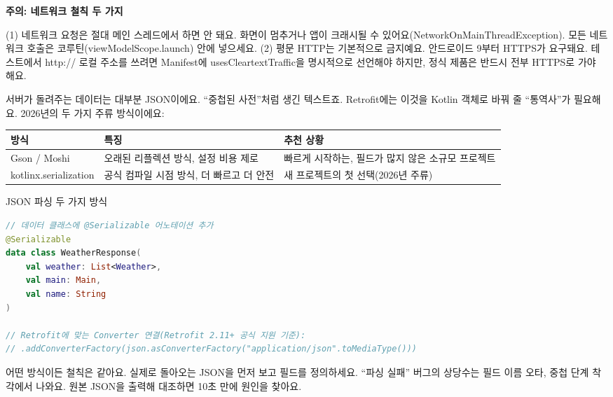 \textbf{주의: 네트워크 철칙 두 가지}\par

(1) 네트워크 요청은 절대 메인 스레드에서 하면 안 돼요. 화면이 멈추거나 앱이 크래시될 수 있어요(NetworkOnMainThreadException). 모든 네트워크 호출은 코루틴(viewModelScope.launch) 안에 넣으세요. (2) 평문 HTTP는 기본적으로 금지예요. 안드로이드 9부터 HTTPS가 요구돼요. 테스트에서 http:// 로컬 주소를 쓰려면 Manifest에 usesCleartextTraffic을 명시적으로 선언해야 하지만, 정식 제품은 반드시 전부 HTTPS로 가야 해요.


서버가 돌려주는 데이터는 대부분 JSON이에요. “중첩된 사전”처럼 생긴 텍스트죠. Retrofit에는 이것을 Kotlin 객체로 바꿔 줄 “통역사”가 필요해요. 2026년의 두 가지 주류 방식이에요:

\begin{center}
\begin{tabularx}{\linewidth}{|X|X|X|}
\hline
\textbf{방식} & \textbf{특징} & \textbf{추천 상황} \tabularnewline
\hline
Gson / Moshi & 오래된 리플렉션 방식, 설정 비용 제로 & 빠르게 시작하는, 필드가 많지 않은 소규모 프로젝트 \tabularnewline
kotlinx.serialization & 공식 컴파일 시점 방식, 더 빠르고 더 안전 & 새 프로젝트의 첫 선택(2026년 주류) \tabularnewline
\hline
\end{tabularx}
\end{center}

\begin{center}\small\color{gray}JSON 파싱 두 가지 방식\end{center}

\begin{lstlisting}[language=Kotlin]
// 데이터 클래스에 @Serializable 어노테이션 추가
@Serializable
data class WeatherResponse(
    val weather: List<Weather>,
    val main: Main,
    val name: String
)

// Retrofit에 맞는 Converter 연결(Retrofit 2.11+ 공식 지원 기준):
// .addConverterFactory(json.asConverterFactory("application/json".toMediaType()))
\end{lstlisting}

어떤 방식이든 철칙은 같아요. 실제로 돌아오는 JSON을 먼저 보고 필드를 정의하세요. “파싱 실패” 버그의 상당수는 필드 이름 오타, 중첩 단계 착각에서 나와요. 원본 JSON을 출력해 대조하면 10초 만에 원인을 찾아요.



